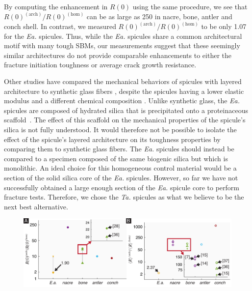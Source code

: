 \documentclass[12pt,onecolumn]{article}
\makeatletter
\newcommand{\TA}{\textit{Ta.\@}\xspace}
\newcommand{\EA}{\textit{Ea.\@}\xspace}
\makeatother
\begin{document}
\begin{bibunit}
By computing the enhancement in $R(0)$ using the same procedure, we see that $R(0)^{(\mathrm{arch})}/R(0)^{(\mathrm{hom})}$ can be as large as 250 in nacre, bone, antler and conch shell. In contrast, we measured $R(0)^{(\mathrm{arch})}/R(0)^{(\mathrm{hom})}$ to be only 1.07 for the \EA spicules. Thus, while the \EA spicules share a common architectural motif with many tough SBMs, our measurements suggest that these seemingly similar architectures do not provide comparable enhancements to either the fracture initiation toughness or average crack growth resistance.

Other studies have compared the mechanical behaviors of spicules with layered architecture to synthetic glass fibers \cite{johnson2010influence,levi1989remarkably,walter2007mechanisms,weaver2010unifying,mayer2005rigid}, despite the spicules having a lower elastic modulus and a different chemical composition \cite{arasuna2018structural, weaver2010unifying, woesz2006micromechanical}. Unlike synthetic glass, the \EA spicules are composed of hydrated silica that is precipitated onto a proteinaceous scaffold~\cite{ehrlich2010chitin}. The effect of this scaffold on the mechanical properties of the spicule's silica is not fully understood. It would therefore not be possible to isolate the effect of the spicule's layered architecture on its toughness properties by comparing them to synthetic glass fibers. The \EA spicules should instead be compared to a specimen composed of the same biogenic silica but which is monolithic. An ideal choice for this homogeneous control material would be a section of the solid silica core of the \EA spicules. However, so far we have not successfully obtained a large enough section of the \EA spicule core to perform fracture tests. Therefore, we chose the \TA spicules as what we believe to be the next best alternative.
%
			\begin{figure}[ht!]
			\centering
			\includegraphics[width=\textwidth]{../Figures/FigureSBMcomp/Figure6_V4.pdf}
			\caption{
}
\end{figure}
\end{bibunit}
\end{document}
